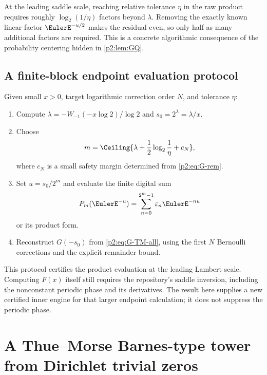 \documentclass[11pt,oneside]{article}
\numberwithin{equation}{section}
\theoremstyle{definition}
\theoremstyle{remark}
\newcommand{\eps}{\varepsilon}
\begin{document}
\begin{remark}
At the leading saddle scale, reaching relative tolerance $\eta$ in the raw product requires
roughly $\log_2(1/\eta)$ factors beyond $\lambda$.  Removing the exactly known linear factor
$\EulerE^{-u/2}$ makes the residual even, so only half as many additional factors are required.
This is a concrete algorithmic consequence of the probability centering hidden in
\cref{p2:lem:GQ}.
\end{remark}

\subsection{A finite-block endpoint evaluation protocol}

\begin{algorithm}
\label{p2:alg:Lambert}
Given small $x>0$, target logarithmic correction order $N$, and tolerance $\eta$:
\begin{enumerate}
\item Compute $\lambda=-W_{-1}(-x\log2)/\log2$ and $s_0=2^\lambda=\lambda/x$.
\item Choose
\[
 m=\Ceiling{\lambda+\frac12\log_2\frac1\eta+c_N},
\]
where $c_N$ is a small safety margin determined from \eqref{p2:eq:G-rem}.
\item Set $u=s_0/2^m$ and evaluate the finite digital sum
\[
 P_m(\EulerE^{-u})=\sum_{n=0}^{2^m-1}\eps_n\EulerE^{-nu}
\]
or its product form.
\item Reconstruct $G(-s_0)$ from \eqref{p2:eq:G-TM-all}, using the first $N$ Bernoulli
corrections and the explicit remainder bound.
\end{enumerate}
\end{algorithm}

\begin{warning}
This protocol certifies the product evaluation at the leading Lambert scale.  Computing
$F(x)$ itself still requires the repository's saddle inversion, including the nonconstant
periodic phase and its derivatives.  The result here supplies a new certified inner engine
for that larger endpoint calculation; it does not suppress the periodic phase.
\end{warning}

\section{A Thue--Morse Barnes-type tower from Dirichlet trivial zeros}
\label{p2:sec:gamma-tower}
\end{document}
